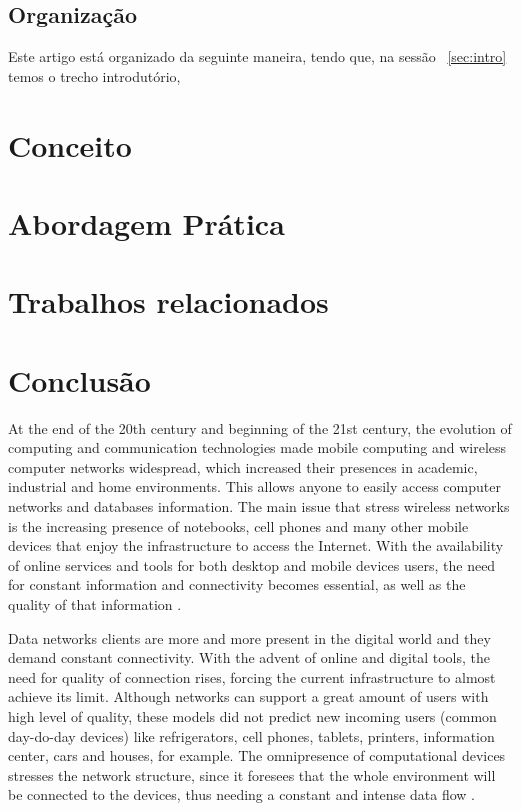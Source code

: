 \documentclass[10pt, conference, compsocconf]{IEEEtran}
\begin{document}
\subsection{Organização}\label{sec:org}

Este artigo está organizado da seguinte maneira, tendo que, na sessão ~\ref{sec:intro} temos o trecho introdutório, 


\section{Conceito}\label{sec:concept}


\section{Abordagem Prática}\label{sec:pratica}


\section{Trabalhos relacionados}\label{sec:rel}


\section{Conclusão}\label{sec:con}



At the end of the 20th century and beginning of the 21st century, the evolution of computing and communication technologies made mobile computing and wireless computer networks widespread, which increased their presences in academic, industrial and home environments. This allows anyone to easily access computer networks and databases information. The main issue that stress wireless networks is the increasing presence of notebooks, cell phones and many other mobile devices that enjoy the infrastructure to access the Internet. With the availability of online services and tools for both desktop and mobile devices users, the need for constant information and connectivity becomes essential, as well as the quality of that information \cite{Zhu:1276870}.

Data networks clients are more and more present in the digital world and they demand constant connectivity. With the advent of online and digital tools, the need for quality of connection rises, forcing the current infrastructure to almost achieve its limit. Although networks can support a great amount of users with high level of quality, these models did not predict new incoming users (common day-do-day devices) like refrigerators, cell phones, tablets, printers, information center, cars and houses, for example. The omnipresence of computational devices stresses the network structure, since it foresees that the whole environment will be connected to the devices, thus needing a constant and intense data flow \cite{Akyildiz:1509968}\cite{Zhu:1276870}.
\end{document}
